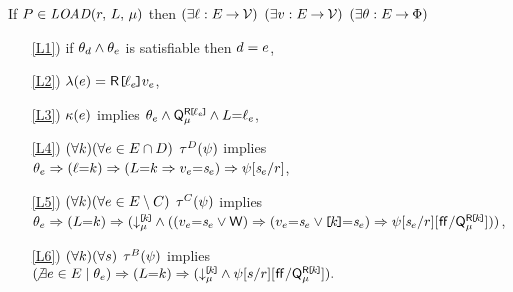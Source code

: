 \noindent
If $\aPS \in \sLOAD[\amode]{\aReg}{\cExp}$ then
$(\exists\ell:E\mathbin\rightarrow\mathcal{V})$
$(\exists v:E\mathbin\rightarrow\mathcal{V})$
$(\exists\theta:E\mathbin\rightarrow\Phi)$
\begin{enumerate}
\item[\ref{L1})] if $\theta_d\land\theta_e$ is satisfiable then $d=e$,
\item[\ref{L2})] $\labelingAct(\aEv) = \DRREF{\cVal_\aEv}{\aVal_\aEv}$,
\item[\ref{L3})] $\kappa(e)$ implies
  \begin{math}
    \theta_e
    \land \smash{\mathsf{Q}_{\mu}^{\mathsf{R}\mkern-2mu\texttt{[}\mkern-2mu\ell_e \mkern-2mu\texttt{]}\mkern-2mu}}
    \land L{=}\ell_e
  \end{math},
\item[\ref{L4})]
  \begin{math}
    (\forall k)
    (\forall e\in E\cap D)
  \end{math}
  $\aTr{\bEvs}{\bForm}$ implies
  \begin{math}
    \cForm_\aEv
    \limplies (\cVal{=}\dVal)
    \limplies (\cExp{=}\dVal\limplies\aVal_\aEv{=}\uReg{\aEv})
    \limplies \bForm[\uReg{\aEv}/\aReg]%
  \end{math},
  \makebox[6.2cm]{}
\item[\ref{L5})] 
  \begin{math}
    (\forall k)
    (\forall e\in E\setminus C)
  \end{math}
  $\aTr{\cEvs}{\bForm}$ implies
  \begin{math}
    \cForm_\aEv
    \limplies (\cExp{=}\dVal)
    \limplies \PBR{        
      \DL{\REF{\dVal}}{\amode} \land
      ((\aVal_\aEv{=}\uReg{\aEv}\lor\RW)
      \limplies (\aVal_\aEv{=}\uReg{\aEv}\lor\REF{\dVal}{=}\uReg{\aEv}) 
      \limplies
      \bForm
      [\uReg{\aEv}/\aReg]%
      [\FALSE/\QL{\REF{\dVal}}{\amode}]
      )
    }      
  \end{math},
\item[\ref{L6})] %
  \begin{math}
    (\forall k)
    (\forall s)
  \end{math}
  $\aTr{\dEvs}{\bForm}$  implies 
  \begin{math}
    (\!\not\exists\aEv\in\aEvs \suchthat \cForm_\aEv)
    \limplies (\cExp{=}\dVal)
    \limplies \PBR{        
      \DL{\REF{\dVal}}{\amode} \land
      \bForm
      [\bReg/\aReg]%
      [\FALSE/\QL{\REF{\dVal}}{\amode}]
    }.
  \end{math}
\end{enumerate}  
